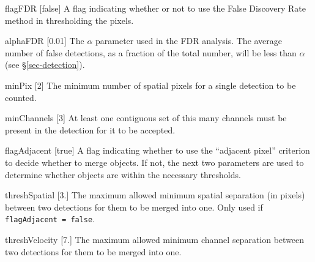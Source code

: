 \begin{Lentry}
\item[{flagFDR [false]}] A flag indicating whether or not to use
  the False Discovery Rate method in thresholding the pixels.
\item[{alphaFDR [0.01]}] The $\alpha$ parameter used in the FDR
  analysis. The average number of false detections, as a fraction of
  the total number, will be less than $\alpha$ (see
  \S\ref{sec-detection}). 
\end{Lentry}

\begin{Lentry}
\item[{minPix [2]}] The minimum number of spatial pixels for a
  single detection to be counted.
\item[{minChannels [3]}] At least one contiguous set of this many
  channels must be present in the detection for it to be accepted.
\item[{flagAdjacent [true]}] A flag indicating whether to use
  the ``adjacent pixel'' criterion to decide whether to merge
  objects. If not, the next two parameters are used to determine
  whether objects are within the necessary thresholds.
\item[{threshSpatial [3.]}] The maximum allowed minimum spatial
  separation (in pixels) between two detections for them to be merged
  into one. Only used if \texttt{flagAdjacent = false}.
\item[{threshVelocity [7.]}] The maximum allowed minimum channel
  separation between two detections for them to be merged into
  one. 
\end{Lentry}

